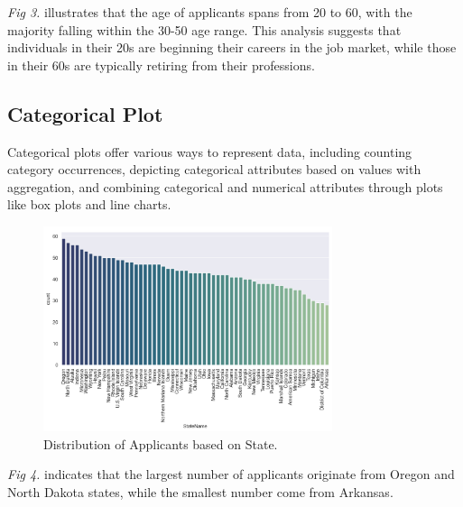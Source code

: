 \documentclass[journal]{IEEEtai}
\begin{document}
{\it Fig 3.} illustrates that the age of applicants spans from 20 to 60, with the majority falling within the 30-50 age range. This analysis suggests that individuals in their 20s are beginning their careers in the job market, while those in their 60s are typically retiring from their professions.

\subsection{Categorical Plot}
Categorical plots offer various ways to represent data, including counting category occurrences, depicting categorical attributes based on values with aggregation, and combining categorical and numerical attributes through plots like box plots and line charts.

\begin{figure}[htbp]
\centerline{\includegraphics[width=20pc]{figures/state-distributionN.png}}
\caption{Distribution of Applicants based on State.}
\end{figure}

{\it Fig 4.} indicates that the largest number of applicants originate from Oregon and North Dakota states, while the smallest number come from Arkansas.
\end{document}
